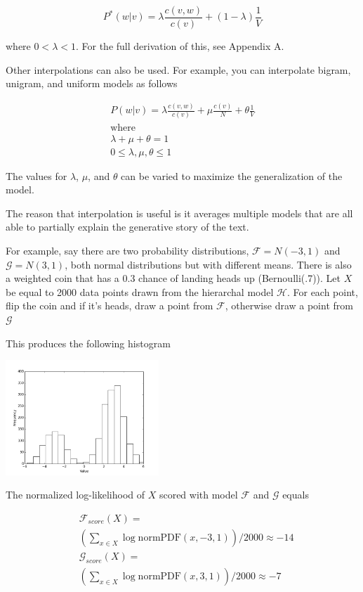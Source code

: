 \documentclass[11pt]{article}
\begin{document}
$$ P^*\left( w \vert v \right) = \lambda \frac{c\left( v, w \right)}{c\left( v\right)} + \left( 1 - \lambda \right) \frac{1}{V} $$

where $0 < \lambda < 1$. For the full derivation of this, see Appendix A.

Other interpolations can also be used. For example, you can interpolate bigram, unigram, and uniform models as follows

\begin{gather*}
P\left( w \vert v \right) = \lambda \frac{c \left(v, w\right)}{c \left(v\right)} + \mu \frac{c \left(v\right)}{N} + \theta \frac{1}{V} \\
\text{where} \\
\lambda + \mu + \theta = 1 \\
0 \leq \lambda, \mu, \theta \leq 1
\end{gather*}

The values for $\lambda$, $\mu$, and $\theta$ can be varied to maximize the generalization of the model.

The reason that interpolation is useful is it averages multiple models that are all able to partially explain the generative story of the text.

For example, say there are two probability distributions, $\mathcal{F} = N\left(-3, 1\right)$ and $\mathcal{G} = N\left(3, 1 \right)$, both normal distributions but with different means. There is also a weighted coin that has a $0.3$ chance of landing heads up (Bernoulli(.7)). Let $X$ be equal to 2000 data points drawn from the hierarchal model $\mathcal{H}$. For each point, flip the coin and if it's heads, draw a point from $\mathcal{F}$, otherwise draw a point from $\mathcal{G}$

This produces the following histogram

\includegraphics[width=218px]{graphs/hist.png}

The normalized log-likelihood of $X$ scored with model $\mathcal{F}$ and $\mathcal{G}$ equals

\begin{align*}
&\mathcal{F}_{score}\left(X\right) = \\
& \left(\sum\limits_{x \in X} \log \text{normPDF}\left(x, -3, 1\right)\right) / 2000 \approx -14 \\
&\mathcal{G}_{score}\left(X\right) = \\
&\left(\sum\limits_{x \in X} \log \text{normPDF}\left(x, 3, 1\right)\right) / 2000 \approx -7
\end{align*}
\end{document}
